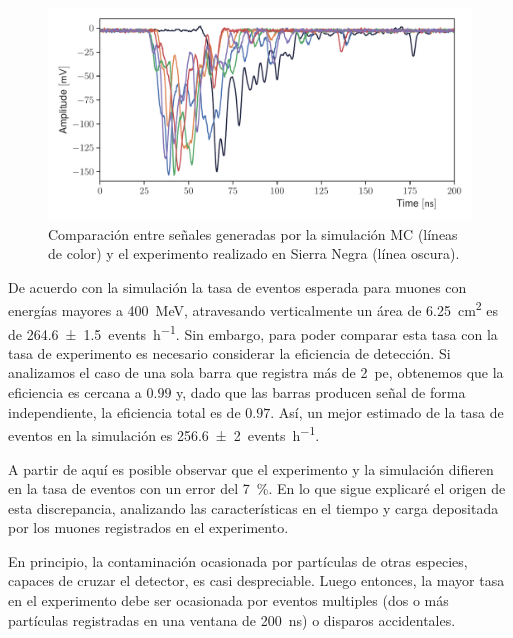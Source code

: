 \begin{figure}
        \centering
        \includegraphics[width=\textwidth]{muon-pulse.pdf}
        \caption{Comparación entre señales generadas por la simulación MC (líneas de color) y el experimento realizado en Sierra Negra (línea oscura).}
        \label{fig:muon-pulse}
\end{figure}

De acuerdo con la simulación la tasa de eventos esperada para muones con energías mayores a \SI{400}{\mega\electronvolt}, atravesando verticalmente un área de \SI{6.25}{\cm\squared} es de \SI{264.6(15)}{events\per\hour}. Sin embargo, para poder comparar esta tasa con la tasa de experimento es necesario considerar la eficiencia de detección. Si analizamos el caso de una sola barra que registra más de \SI{2}{pe}, obtenemos que la eficiencia es cercana a $0.99$ y, dado que las barras producen señal de forma independiente, la eficiencia total es de $0.97$. Así, un mejor estimado de la tasa de eventos en la simulación es \SI{256.6(20)}{events\per\hour}.

A partir de aquí es posible observar que el experimento y la simulación difieren en la tasa de eventos con un error del \SI{7}{\percent}. En lo que sigue explicaré el origen de esta discrepancia, analizando las características en el tiempo y carga depositada por los muones registrados en el experimento.

En principio, la contaminación ocasionada por partículas de otras especies, capaces de cruzar el detector, es casi despreciable. Luego entonces, la mayor tasa en el experimento debe ser ocasionada por eventos multiples (dos o más partículas registradas en una ventana de \SI{200}{\ns}) o disparos accidentales.


